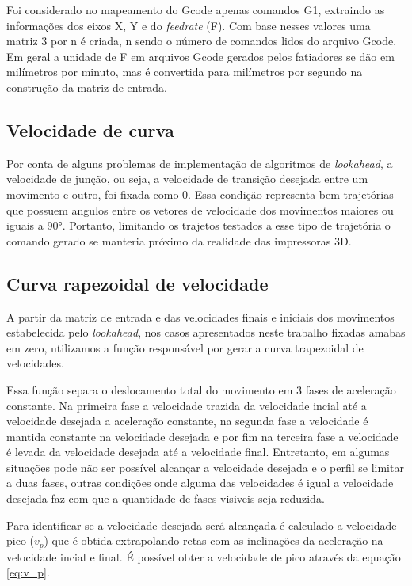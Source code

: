 Foi considerado no mapeamento do Gcode apenas comandos G1, extraindo
as informações dos eixos X, Y e do \textit{feedrate} (F). Com base nesses valores
uma matriz 3 por n é criada, n sendo o número de comandos lidos do arquivo Gcode.
Em geral a unidade de F em arquivos Gcode gerados pelos fatiadores se dão em milímetros por minuto,
mas é convertida para milímetros por segundo na construção da matriz de entrada.

\subsection{Velocidade de curva}

Por conta de alguns problemas de implementação de algoritmos de \textit{lookahead}, a velocidade
de junção, ou seja, a velocidade de transição desejada entre um movimento e outro, foi fixada como 0.
Essa condição representa bem trajetórias que possuem angulos entre os vetores de velocidade dos movimentos
maiores ou iguais a 90°. Portanto, limitando os trajetos testados a esse tipo de trajetória o comando gerado
se manteria próximo da realidade das impressoras 3D.

\subsection{Curva rapezoidal de velocidade}
A partir da matriz de entrada e das velocidades finais e iniciais dos movimentos estabelecida pelo \textit{lookahead},
nos casos apresentados neste trabalho fixadas amabas em zero,
utilizamos a função responsável por gerar a curva trapezoidal de velocidades.

Essa função separa o deslocamento total do movimento em 3 fases de aceleração constante.
Na primeira fase a velocidade trazida da velocidade incial até a velocidade desejada
a aceleração constante, na segunda fase a velocidade é mantida constante na velocidade desejada
e por fim na terceira fase a velocidade é levada da velocidade desejada até a velocidade final.
Entretanto, em algumas situações pode não ser possível alcançar a velocidade desejada
e o perfil se limitar a duas fases, outras condições onde alguma das velocidades é igual a
velocidade desejada faz com que a quantidade de fases visiveis seja reduzida.

Para identificar se a velocidade desejada será alcançada é calculado a velocidade pico ($v_p$)
que é obtida extrapolando retas com as inclinações da aceleração na velocidade incial e final.
É possível obter a velocidade de pico através da equação \ref{eq:v_p}.

